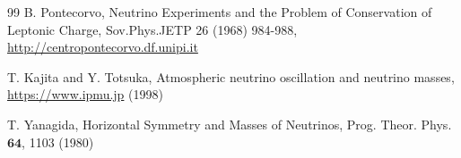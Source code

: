 \documentclass[%
 reprint,
 amsmath,amssymb,
 aps,
]{revtex4-1}
\numberwithin{equation}{section}%
\begin{document}
\begin{thebibliography}{99}
     B. Pontecorvo, Neutrino Experiments and the Problem of Conservation of Leptonic Charge, Sov.Phys.JETP 26 (1968) 984-988, \href{http://centropontecorvo.df.unipi.it/Articles/Neutrino_Experiments_and_the_Problem_of_Conservation_of_Leptonic_Charge_JETP-1968.pdf}{http://centropontecorvo.df.unipi.it}
    
     T. Kajita and Y. Totsuka, Atmospheric neutrino oscillation and neutrino masses, \href{https://www.ipmu.jp/sites/default/files/imce/E02_Feature.pdf}{https://www.ipmu.jp} (1998)
    
     T. Yanagida, Horizontal Symmetry and Masses of Neutrinos, Prog. Theor. Phys. $\textbf{64}$, 1103 (1980)
\end{thebibliography}


\end{document}
